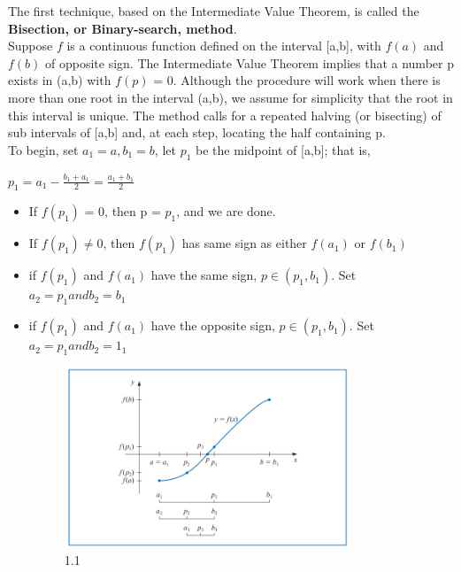 \documentclass[12pt,a4paper]{article}
\begin{document}
	The first technique, based on the Intermediate Value Theorem, is called the \textbf{Bisection, or Binary-search, method}. \\
	
	Suppose \(f \) is a continuous function defined on the interval [a,b], with \(f(a)\) and \(f(b)\) of opposite sign. The Intermediate Value Theorem implies that a number p exists in (a,b) with \(f(p)\) = 0. Although the procedure will work when there is more than one root in the interval (a,b), we assume for simplicity that the root in this interval is unique. The method calls for a repeated halving (or bisecting)  of sub intervals of [a,b] and, at each step, locating the half containing p. \\
	
	To begin, set $a_{1} = a,b_{1} = b$, let $p_{1}$ be the midpoint of [a,b]; that is,
	
	{ \centering
		$ p_{1} = a_{1} - \frac{b_{1} + a_{1}}{2} = \frac{a_{1} + b_{1}}{2}$ \\
	}
	\begin{itemize}
		\item If \(f(p_{1})\) = 0, then p = $p_{1}$, and we are done. 
		\item If \(f(p_{1})\)$ \neq 0$, then \(f(p_{1})\) has same sign as either \(f(a_{1})\) or \(f(b_{1})\)
		
		\item if \(f(p_{1})\) and \(f(a_{1})\) have the same sign, $ p  \in (p_{1},b_{1})$. Set $a_{2}=p_{1} and b_{2}= b_{1}$
		
		\item if \(f(p_{1})\) and \(f(a_{1})\) have the opposite sign, $ p  \in (p_{1},b_{1})$. Set $a_{2}=p_{1} and b_{2}= 1_{1}$\\
		
		
		\begin{figure}[h]
			\centering
			\includegraphics[width=0.8\textwidth]{B1.png}
			\caption{1.1}
			
		\end{figure}
	\end{itemize}
	
\end{document}
